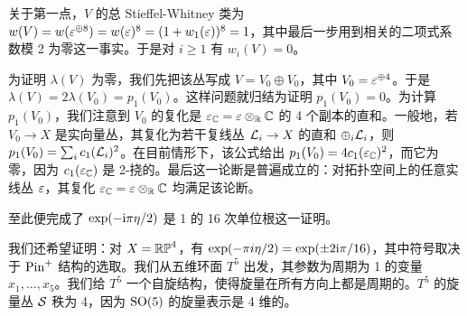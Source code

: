 关于第一点，$V$ 的总 Stieffel-Whitney 类为 $w(V)=w(\veps^{\oplus 8})=w(\veps)^8=(1+w_1(\veps))^8=1$，其中最后一步用到相关的二项式系数模 2 为零这一事实。于是对 $i\geq 1$ 有 $w_i(V)=0$。

为证明 $\lambda(V)$ 为零，我们先把该丛写成 $V=V_0\oplus V_0$，其中 $V_0=\veps^{\oplus 4}$。于是 $\lambda(V) =2\lambda(V_0)=p_1(V_0)$。这样问题就归结为证明 $p_1(V_0)=0$。为计算 $p_1(V_0)$，我们注意到 $V_0$ 的复化是 $\veps_\C=\veps\otimes_\R\C$ 的 4 个副本的直和。一般地，若 $V_0\to X$ 是实向量丛，其复化为若干复线丛 $\L_i\to X$ 的直和 $\oplus_i \L_i$，则 $p_1(V_0)=\sum_i c_1(\L_i)^2$。在目前情形下，该公式给出 $p_1(V_0)=4c_1(\veps_\C)^2$，而它为零，因为 $c_1(\veps_\C)$ 是 2-挠的。最后这一论断是普遍成立的：对拓扑空间上的任意实线丛 $\veps$，其复化 $\veps_\C=\veps\otimes_\R\C$ 均满足该论断。

至此便完成了 $\exp(-\i\pi \eta/2)$ 是 1 的 16 次单位根这一证明。

我们还希望证明：对 $X=\RP^4$，有 $\exp(-\pi i\eta/2)=\exp(\pm 2\i\pi /16)$，其中符号取决于 $\Pin^+$ 结构的选取。我们从五维环面 $T^5$ 出发，其参数为周期为 1 的变量 $x_1,\dots,x_5$。我们给 $T^5$ 一个自旋结构，使得旋量在所有方向上都是周期的。$T^5$ 的旋量丛 $\S$ 秩为 4，因为 $\SO(5)$ 的旋量表示是 4 维的。

